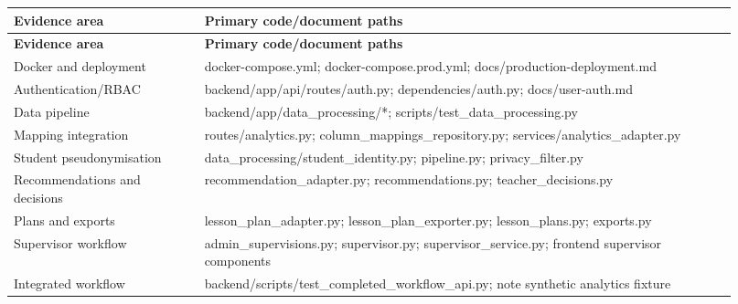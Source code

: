 \documentclass[11pt,a4paper]{article}
\begin{document}
\begin{small}

\setlength{\tabcolsep}{3pt}

\begin{longtable}{>{\raggedright\arraybackslash}p{0.246\linewidth}>{\raggedright\arraybackslash}p{0.674\linewidth}}

\hline

\textbf{Evidence area} & \textbf{Primary code/\allowbreak{}document paths} \\ \hline

\endfirsthead

\hline

\textbf{Evidence area} & \textbf{Primary code/\allowbreak{}document paths} \\ \hline

\endhead

Docker and deployment & docker-compose.yml; docker-compose.prod.yml; docs/\allowbreak{}production-deployment.md \\ \hline

Authentication/\allowbreak{}RBAC & backend/\allowbreak{}app/\allowbreak{}api/\allowbreak{}routes/\allowbreak{}auth.py; dependencies/\allowbreak{}auth.py; docs/\allowbreak{}user-auth.md \\ \hline

Data pipeline & backend/\allowbreak{}app/\allowbreak{}data\_\allowbreak{}processing/\allowbreak{}*; scripts/\allowbreak{}test\_\allowbreak{}data\_\allowbreak{}processing.py \\ \hline

Mapping integration & routes/\allowbreak{}analytics.py; column\_\allowbreak{}mappings\_\allowbreak{}repository.py; services/\allowbreak{}analytics\_\allowbreak{}adapter.py \\ \hline

Student pseudonymisation & data\_\allowbreak{}processing/\allowbreak{}student\_\allowbreak{}identity.py; pipeline.py; privacy\_\allowbreak{}filter.py \\ \hline

Recommendations and decisions & recommendation\_\allowbreak{}adapter.py; recommendations.py; teacher\_\allowbreak{}decisions.py \\ \hline

Plans and exports & lesson\_\allowbreak{}plan\_\allowbreak{}adapter.py; lesson\_\allowbreak{}plan\_\allowbreak{}exporter.py; lesson\_\allowbreak{}plans.py; exports.py \\ \hline

Supervisor workflow & admin\_\allowbreak{}supervisions.py; supervisor.py; supervisor\_\allowbreak{}service.py; frontend supervisor components \\ \hline

Integrated workflow & backend/\allowbreak{}scripts/\allowbreak{}test\_\allowbreak{}completed\_\allowbreak{}workflow\_\allowbreak{}api.py; note synthetic analytics fixture \\ \hline

\end{longtable}

\end{small}
\end{document}
